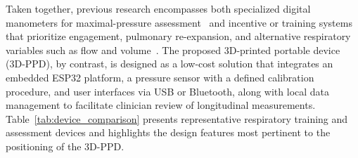 \documentclass{ieeeaccess}
\begin{document}
{Taken together}, previous research encompasses both specialized digital manometers for maximal-pressure assessment~\cite{pereiraTrueForceDigital2021,silveiraNewMethodMaximalPressures2021,silveiraMaximalPressuresFRC2023} and incentive or training systems that prioritize engagement, pulmonary re-expansion, and alternative respiratory variables such as flow and volume~\cite{aguilarZambranoUbicu2025,polancoBiomedicalEquipmentUbicu2024}. The proposed 3D-printed portable device (3D-PPD), by contrast, is designed as a low-cost solution that integrates an embedded ESP32 platform, a pressure sensor with a defined calibration procedure, and user interfaces via USB or Bluetooth, along with local data management to facilitate clinician review of longitudinal measurements. Table~\ref{tab:device_comparison} presents representative respiratory training and assessment devices and highlights the design features most pertinent to the positioning of the 3D-PPD.
\end{document}
